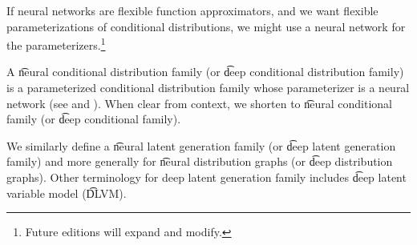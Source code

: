 

If neural networks are flexible function approximators, and we want flexible parameterizations of conditional distributions, we might use a neural network for the parameterizers.\footnote{Future editions will expand and modify.}


A \t{neural conditional distribution family} (or \t{deep conditional distribution family}) is a parameterized conditional distribution family whose parameterizer is a neural network (see  and ).
When clear from context, we shorten to \t{neural conditional family} (or \t{deep conditional family}).

We similarly define a \t{neural latent generation family} (or \t{deep latent generation family}) and more generally for \t{neural distribution graphs} (or \t{deep distribution graphs}).
Other terminology for deep latent generation family includes \t{deep latent variable model} (\t{DLVM}).

\blankpage
